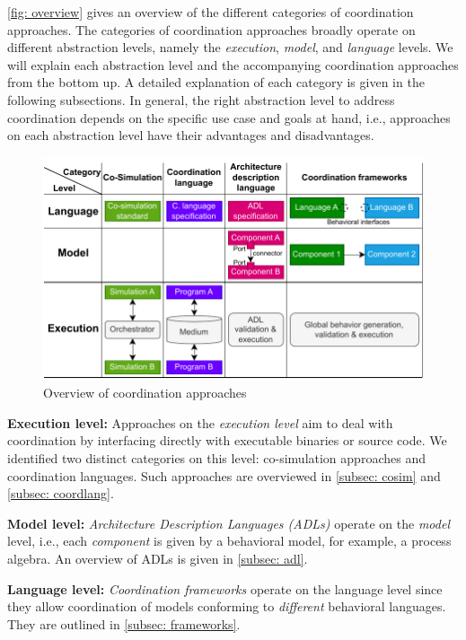 \documentclass[runningheads]{llncs}
\begin{document}
\autoref{fig: overview} gives an overview of the different categories of coordination approaches.
The categories of coordination approaches broadly operate on different abstraction levels, namely the \textit{execution}, \textit{model}, and \textit{language} levels.
We will explain each abstraction level and the accompanying coordination approaches from the bottom up.
A detailed explanation of each category is given in the following subsections.
In general, the right abstraction level to address coordination depends on the specific use case and goals at hand, i.e., approaches on each abstraction level have their advantages and disadvantages.

\begin{figure}[ht]
	\centering
	\includegraphics[width=1\textwidth]{images/overview}
	\caption{Overview of coordination approaches}
	\label{fig: overview}
\end{figure}

\textbf{Execution level:} Approaches on the \textit{execution level} aim to deal with coordination by interfacing directly with executable binaries or source code.
We identified two distinct categories on this level: co-simulation approaches and coordination languages.
Such approaches are overviewed in \autoref{subsec: cosim} and \autoref{subsec: coordlang}.

\textbf{Model level:}
\textit{Architecture Description Languages (ADLs)} operate on the \textit{model} level, i.e., each \textit{component} is given by a behavioral model, for example, a process algebra.
An overview of ADLs is given in \autoref{subsec: adl}.

\textbf{Language level:}
\textit{Coordination frameworks} operate on the language level since they allow coordination of models conforming to \textit{different} behavioral languages.
They are outlined in \autoref{subsec: frameworks}.
\end{document}
